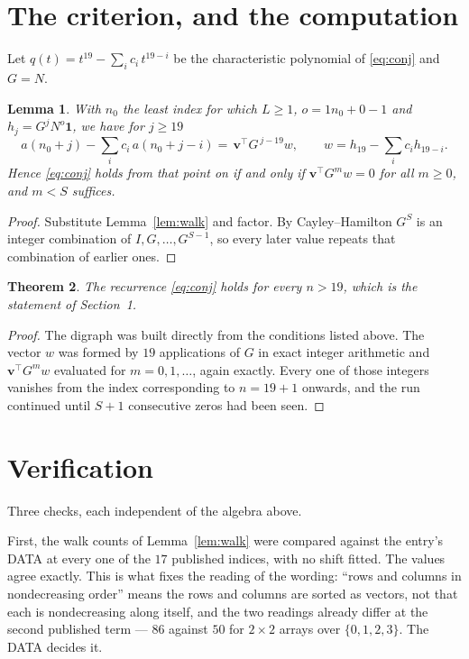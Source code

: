 \documentclass[11pt,a4paper]{article}
\theoremstyle{plain}
\newtheorem{theorem}{Theorem}
\newtheorem{lemma}[theorem]{Lemma}
\theoremstyle{definition}
\begin{document}
\section{The criterion, and the computation}

Let $q(t)=t^{19}-\sum_i c_i\,t^{19-i}$ be the characteristic polynomial of
\eqref{eq:conj} and $G=N$.

\begin{lemma}\label{lem:crit}
With $n_0$ the least index for which $L\ge1$, $o=1n_0+0-1$ and
$h_j=G^{j}N^{o}\mathbf{1}$, we have for $j\ge19$
\[
a(n_0+j)-\sum_i c_i\,a(n_0+j-i)=\,\mathbf{v}^{\!\top}G^{\,j-19}w,
\qquad w=h_{19}-\sum_i c_ih_{19-i} .
\]
Hence \eqref{eq:conj} holds from that point on if and only if
$\mathbf{v}^{\!\top}G^{m}w=0$ for all $m\ge0$, and $m<S$ suffices.
\end{lemma}

\begin{proof}
Substitute Lemma~\ref{lem:walk} and factor. By Cayley--Hamilton $G^{S}$ is an integer
combination of $I,G,\dots,G^{S-1}$, so every later value repeats that combination of
earlier ones.
\end{proof}

\begin{theorem}
The recurrence \eqref{eq:conj} holds for every $n>19$, which is the statement of
Section~1.
\end{theorem}

\begin{proof}
The digraph was built directly from the conditions listed above. The vector $w$ was formed by
$19$ applications of $G$ in exact integer arithmetic and $\mathbf{v}^{\!\top}G^{m}w$
evaluated for $m=0,1,\dots$, again exactly. Every one of those integers vanishes from the
index corresponding to $n=19+1$ onwards, and the run continued until $S+1$ consecutive
zeros had been seen.
\end{proof}

\section{Verification}

Three checks, each independent of the algebra above.

First, the walk counts of Lemma~\ref{lem:walk} were compared against the entry's DATA at
every one of the $17$ published indices, with no shift fitted. The values agree exactly.
This is what fixes the reading of the wording: ``rows and columns in nondecreasing order''
means the rows and columns are sorted as vectors, not that each is nondecreasing along
itself, and the two readings already differ at the second published term --- $86$ against
$50$ for $2\times2$ arrays over $\{0,1,2,3\}$. The DATA decides it.
\end{document}

